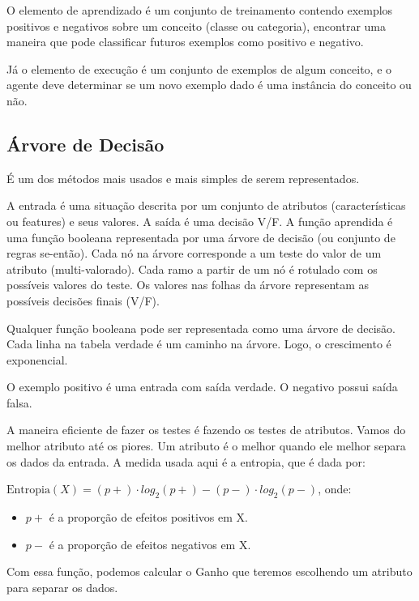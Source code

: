 \documentclass[12pt,letterpaper]{article}
\begin{document}
	O elemento de aprendizado é um conjunto de treinamento contendo exemplos positivos e negativos sobre um conceito (classe ou categoria), encontrar uma maneira que pode classificar futuros exemplos como positivo e negativo.
	
	Já o elemento de execução é um conjunto de exemplos de algum conceito, e o agente deve determinar se um novo exemplo dado é uma instância do conceito ou não. 
	
	\subsection*{Árvore de Decisão}
	
	É um dos métodos mais usados e mais simples de serem representados.
	
	A entrada é uma situação descrita por um conjunto de atributos (características ou features) e seus valores. A saída é uma decisão V/F. A função aprendida é uma função booleana representada por uma árvore de decisão (ou conjunto de regras se-então). Cada nó na árvore corresponde a um teste do valor de um atributo (multi-valorado). Cada ramo a partir de um nó é rotulado com os possíveis valores do teste. Os valores nas folhas da árvore representam as possíveis decisões finais (V/F).
	
	Qualquer função booleana pode ser representada como uma árvore de decisão. Cada linha na tabela verdade é um caminho na árvore. Logo, o crescimento é exponencial.
	
	O exemplo positivo é uma entrada com saída verdade. O negativo possui saída falsa.
	
	A maneira eficiente de fazer os testes é fazendo os testes de atributos. Vamos do melhor atributo até os piores. Um atributo é o melhor quando ele melhor separa os dados da entrada. A medida usada aqui é a entropia, que é dada por:
	
	\begin{center}
		$\text{Entropia}(X) = (p+) \cdot log_2(p+) - (p-) \cdot log_2(p-)$, onde:
	\end{center}
	
	\begin{itemize}
		\item $p+$ é a proporção de efeitos positivos em X.
		\item $p-$ é a proporção de efeitos negativos em X.
	\end{itemize}
	
	Com essa função, podemos calcular o Ganho que teremos escolhendo um atributo para separar os dados.
	
\end{document}
